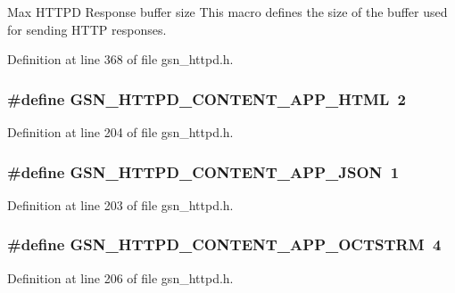 Max HTTPD Response buffer size This macro defines the size of the buffer used for sending HTTP responses. 



Definition at line 368 of file gsn\_\-httpd.h.

\hypertarget{a00666_ga19c52b08a8222ee99b7bbfb85ce76435}{
\subsubsection[{GSN\_\-HTTPD\_\-CONTENT\_\-APP\_\-HTML}]{\setlength{\rightskip}{0pt plus 5cm}\#define GSN\_\-HTTPD\_\-CONTENT\_\-APP\_\-HTML~2}}
\label{a00666_ga19c52b08a8222ee99b7bbfb85ce76435}


Definition at line 204 of file gsn\_\-httpd.h.

\hypertarget{a00666_gadb38ca97283506dc6dc4fd43956d3f1b}{
\subsubsection[{GSN\_\-HTTPD\_\-CONTENT\_\-APP\_\-JSON}]{\setlength{\rightskip}{0pt plus 5cm}\#define GSN\_\-HTTPD\_\-CONTENT\_\-APP\_\-JSON~1}}
\label{a00666_gadb38ca97283506dc6dc4fd43956d3f1b}


Definition at line 203 of file gsn\_\-httpd.h.

\hypertarget{a00666_ga609fa91a2102bbc3f21d0fb9c2f492a9}{
\subsubsection[{GSN\_\-HTTPD\_\-CONTENT\_\-APP\_\-OCTSTRM}]{\setlength{\rightskip}{0pt plus 5cm}\#define GSN\_\-HTTPD\_\-CONTENT\_\-APP\_\-OCTSTRM~4}}
\label{a00666_ga609fa91a2102bbc3f21d0fb9c2f492a9}


Definition at line 206 of file gsn\_\-httpd.h.

